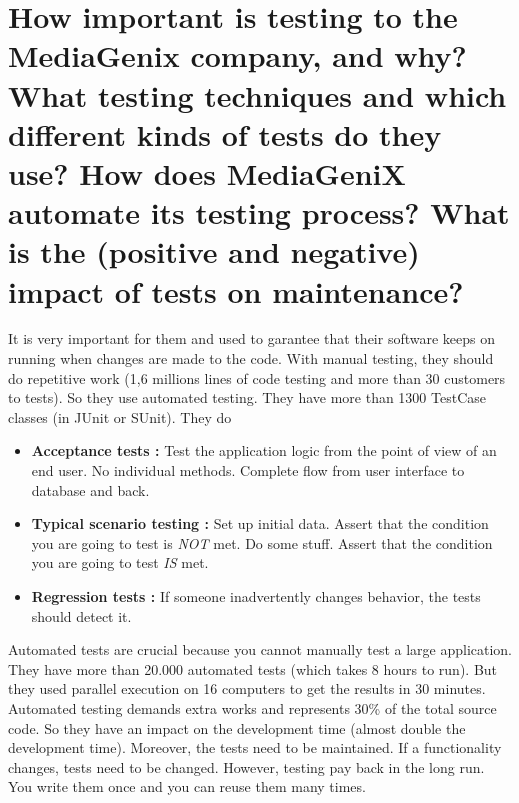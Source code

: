 \section{How important is testing to the MediaGenix company, and why?
What testing techniques and which different kinds of tests do they use?
How does MediaGeniX automate its testing process?
What is the (positive and negative) impact of tests on maintenance?}

It is very important for them and used to garantee that their software keeps on running when changes are made to the code. 
With manual testing, they should do repetitive work (1,6 millions lines of code testing and more than 30 customers to tests). So they use automated testing. They have more than 1300 TestCase classes (in JUnit or SUnit).
They do 
\begin{itemize}
\item \textbf{Acceptance tests : } Test the application logic from the point of view of an end user. No individual methods. Complete flow from user interface to database and back.
\item \textbf{Typical scenario testing : } Set up initial data. Assert that the condition you are going to test is \emph{NOT} met. Do some stuff. Assert that the condition you are going to test \emph{IS} met.
\item \textbf{Regression tests : } If someone inadvertently changes behavior, the tests should detect it.
\end{itemize}
Automated tests are crucial because you cannot manually test a large application. They have more than 20.000 automated tests (which takes 8 hours to run). But they used parallel execution on 16 computers to get the results in 30 minutes.
Automated testing demands extra works and represents 30\% of the total source code. So they have an impact on the development time (almost double the development time). Moreover, the tests need to be maintained. If a functionality changes, tests need to be changed.
However, testing pay back in the long run. You write them once and you can reuse them many times.

